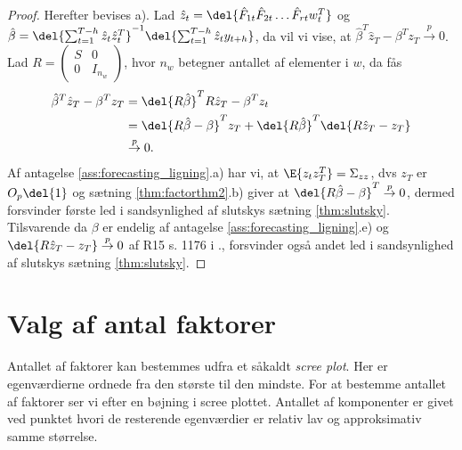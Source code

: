 \begin{proof}
Herefter bevises a).
Lad \(\hat{z}_t = \del{\hat{F}_{1t} \hat{F}_{2t} \dots \hat{F}_{rt} w_t^T}\) og \(\hat{\beta} = \del{\sum_{t=1}^{T-h} \hat{z}_t \hat{z}_t^T}^{-1} \del{\sum_{t=1}^{T-h} \hat{z}_t y_{t+h}}\), da vil vi vise, at \(\hat{\beta}^T \hat{z}_T - \beta^T z_T \overset{p}{\rightarrow} 0\).
Lad \(R = \begin{pmatrix}
S & 0 \\ 0 & I_{n_w}
\end{pmatrix}\), hvor \(n_w\) betegner antallet af elementer i \(w\), da fås
\begin{align*}
\hat{\beta}^T \hat{z}_T - \beta^T z_T &= \del{R \hat{\beta}}^T R \hat{z}_T - \beta^T z_t \\
&= \del{R \hat{\beta} - \beta}^T z_T + \del{R \hat{\beta}}^T \del{R \hat{z}_T - z_T} \\
&\overset{p}{\rightarrow} 0.
\end{align*}
Af antagelse \ref{ass:forecasting_ligning}.a) har vi, at \(\E{z_t z_T^T} = \Sigma_{zz}\), dvs \(z_T\) er \(O_p \del{1}\) og sætning \ref{thm:factorthm2}.b) giver at \(\del{R \hat{\beta} - \beta}^T \overset{p}{\rightarrow} 0\), dermed forsvinder første led i sandsynlighed af slutskys sætning \ref{thm:slutsky}.
Tilsvarende da \(\beta\) er endelig af antagelse \ref{ass:forecasting_ligning}.e) og \(\del{R \hat{z}_T - z_T} \overset{p}{\rightarrow} 0\) af R15 s. 1176 i \citep{stock_watson_2002a}., forsvinder også andet led i sandsynlighed af slutskys sætning \ref{thm:slutsky}. 
\end{proof}

\section{Valg af antal faktorer}
Antallet af faktorer kan bestemmes udfra et såkaldt \textit{scree plot}.
Her er egenværdierne ordnede fra den største til den mindste.
For at bestemme antallet af faktorer ser vi efter en bøjning i scree plottet.
Antallet af komponenter er givet ved punktet hvori de resterende egenværdier er relativ lav og approksimativ samme størrelse.

